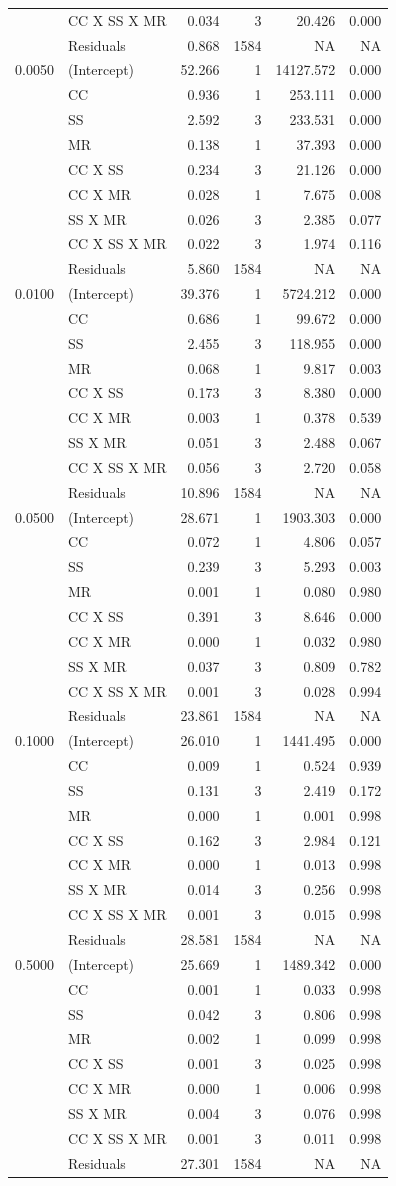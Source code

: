 \documentclass[]{article}
\theoremstyle{definition}
\theoremstyle{definition}
\theoremstyle{definition}
\theoremstyle{remark}
\begin{document}
\begin{longtable}[]{@{}llrrrr@{}}
& CC X SS X MR & 0.034 & 3 & 20.426 & 0.000\tabularnewline
& Residuals & 0.868 & 1584 & NA & NA\tabularnewline
0.0050 & (Intercept) & 52.266 & 1 & 14127.572 & 0.000\tabularnewline
& CC & 0.936 & 1 & 253.111 & 0.000\tabularnewline
& SS & 2.592 & 3 & 233.531 & 0.000\tabularnewline
& MR & 0.138 & 1 & 37.393 & 0.000\tabularnewline
& CC X SS & 0.234 & 3 & 21.126 & 0.000\tabularnewline
& CC X MR & 0.028 & 1 & 7.675 & 0.008\tabularnewline
& SS X MR & 0.026 & 3 & 2.385 & 0.077\tabularnewline
& CC X SS X MR & 0.022 & 3 & 1.974 & 0.116\tabularnewline
& Residuals & 5.860 & 1584 & NA & NA\tabularnewline
0.0100 & (Intercept) & 39.376 & 1 & 5724.212 & 0.000\tabularnewline
& CC & 0.686 & 1 & 99.672 & 0.000\tabularnewline
& SS & 2.455 & 3 & 118.955 & 0.000\tabularnewline
& MR & 0.068 & 1 & 9.817 & 0.003\tabularnewline
& CC X SS & 0.173 & 3 & 8.380 & 0.000\tabularnewline
& CC X MR & 0.003 & 1 & 0.378 & 0.539\tabularnewline
& SS X MR & 0.051 & 3 & 2.488 & 0.067\tabularnewline
& CC X SS X MR & 0.056 & 3 & 2.720 & 0.058\tabularnewline
& Residuals & 10.896 & 1584 & NA & NA\tabularnewline
0.0500 & (Intercept) & 28.671 & 1 & 1903.303 & 0.000\tabularnewline
& CC & 0.072 & 1 & 4.806 & 0.057\tabularnewline
& SS & 0.239 & 3 & 5.293 & 0.003\tabularnewline
& MR & 0.001 & 1 & 0.080 & 0.980\tabularnewline
& CC X SS & 0.391 & 3 & 8.646 & 0.000\tabularnewline
& CC X MR & 0.000 & 1 & 0.032 & 0.980\tabularnewline
& SS X MR & 0.037 & 3 & 0.809 & 0.782\tabularnewline
& CC X SS X MR & 0.001 & 3 & 0.028 & 0.994\tabularnewline
& Residuals & 23.861 & 1584 & NA & NA\tabularnewline
0.1000 & (Intercept) & 26.010 & 1 & 1441.495 & 0.000\tabularnewline
& CC & 0.009 & 1 & 0.524 & 0.939\tabularnewline
& SS & 0.131 & 3 & 2.419 & 0.172\tabularnewline
& MR & 0.000 & 1 & 0.001 & 0.998\tabularnewline
& CC X SS & 0.162 & 3 & 2.984 & 0.121\tabularnewline
& CC X MR & 0.000 & 1 & 0.013 & 0.998\tabularnewline
& SS X MR & 0.014 & 3 & 0.256 & 0.998\tabularnewline
& CC X SS X MR & 0.001 & 3 & 0.015 & 0.998\tabularnewline
& Residuals & 28.581 & 1584 & NA & NA\tabularnewline
0.5000 & (Intercept) & 25.669 & 1 & 1489.342 & 0.000\tabularnewline
& CC & 0.001 & 1 & 0.033 & 0.998\tabularnewline
& SS & 0.042 & 3 & 0.806 & 0.998\tabularnewline
& MR & 0.002 & 1 & 0.099 & 0.998\tabularnewline
& CC X SS & 0.001 & 3 & 0.025 & 0.998\tabularnewline
& CC X MR & 0.000 & 1 & 0.006 & 0.998\tabularnewline
& SS X MR & 0.004 & 3 & 0.076 & 0.998\tabularnewline
& CC X SS X MR & 0.001 & 3 & 0.011 & 0.998\tabularnewline
& Residuals & 27.301 & 1584 & NA & NA\tabularnewline
\bottomrule
\end{longtable}
\end{document}
